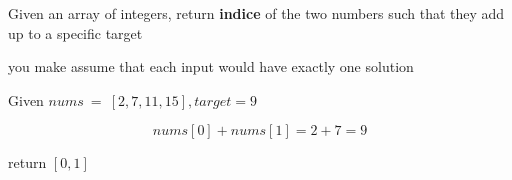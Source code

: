 Given an array of integers, return {\bf{indice}} of the two
numbers such that they add up to a specific target



you make assume that each input would have exactly one solution


Given $nums\ =\ [ 2, 7 ,11,15], target = 9$

$$nums[0]+nums[1]=2+7=9$$

return $[0,1]$

\bye
